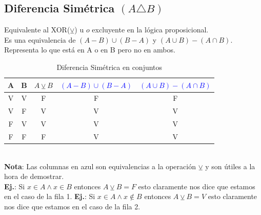\documentclass[10pt,a4paper]{article}
\begin{document}
\subsection*{Diferencia Simétrica $(A \triangle B)$}
Equivalente al XOR($\veebar$) u $o$ excluyente en la lógica proposicional. \\
Es una equivalencia de $(A - B) \cup (B - A)$ y $(A\cup B) - (A \cap B)$. Representa lo que está en A o en B pero no en ambos. 
\begin{table}[h!]
    \centering
    \begin{tabular}{|c | c | c | c | c|}
    \hline
    \textbf{A} & \textbf{B} & \textbf{$A \veebar B$} & \textcolor{blue}{$(A - B) \cup (B - A)$} & \textcolor{blue}{$(A\cup B) - (A \cap B)$} \\[0.1cm]
    \hline
    V & V & F & F & F \\
    V & F & V & V & V \\
    F & V & V & V & V \\
    F & F & F & V & V \\
    \hline
    \end{tabular}
    \caption{Diferencia Simétrica en conjuntos}
\end{table} \\
\textbf{Nota}: Las columnas en azul son equivalencias a la operación $\veebar$ y son útiles a la hora de demostrar. \\
\textbf{Ej.}: Si $x \in A \land x \in B$ entonces $ A \veebar B = F$ esto claramente nos dice que estamos en el caso de la fila 1.
\textbf{Ej.}: Si $x \in A \land x \notin B$ entonces $ A \veebar B = V$ esto claramente nos dice que estamos en el caso de la fila 2. \\
\end{document}

